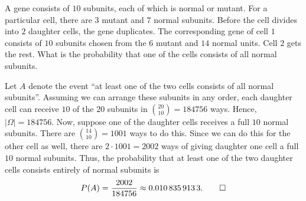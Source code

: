 \begin{problem}[Handout 1, \# 7]
  A gene consists of \(10\) subunits, each of which is normal or
  mutant. For a particular cell, there are \(3\) mutant and \(7\) normal
  subunits. Before the cell divides into \(2\) daughter cells, the gene
  duplicates. The corresponding gene of cell \(1\) consists of \(10\)
  subunits chosen from the \(6\) mutant and \(14\) normal units. Cell \(2\)
  gets the rest. What is the probability that one of the cells consists of
  all normal subunits.
\end{problem}
\begin{solution*}
  Let \(A\) denote the event ``at least one of the two cells consists of
  all normal subunits''. Assuming we can arrange these subunits in any
  order, each daughter cell can receive \(10\) of the \(20\) subunits in
  \(\binom{20}{10}=184756\) ways. Hence, \(|\Omega|=184756\). Now, suppose
  one of the daughter cells receives a full \(10\) normal subunits. There
  are \(\binom{14}{10}=1001\) ways to do this. Since we can do this for the
  other cell as well, there are \(2\cdot 1001=2002\) ways of giving
  daughter one cell a full \(10\) normal subunits. Thus, the probability
  that at least one of the two daughter cells consists entirely of normal
  subunits is
  \[
    P(A)=\frac{2002}{184756}\approx\num{0.0108359133}.\qedhere
  \]
\end{solution*}

